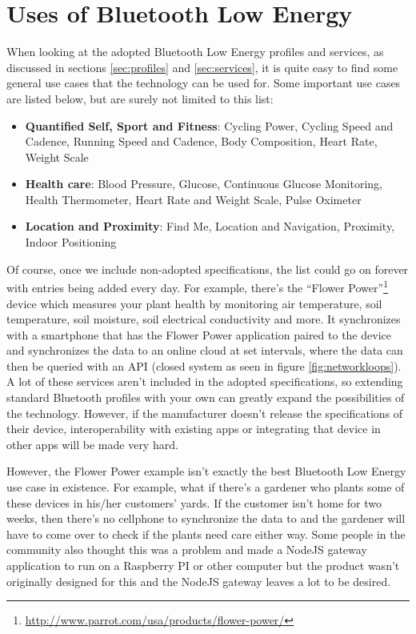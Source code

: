 \documentclass[pdftex,a4paper,12pt,twoside]{report}
\begin{document}
\newpage{}

\section{Uses of Bluetooth Low Energy}
\label{sec:usesble}
When looking at the adopted Bluetooth Low Energy profiles and services, as discussed in sections \ref{sec:profiles} and \ref{sec:services}, it is quite easy to find some general use cases that the technology can be used for. Some important use cases are listed below, but are surely not limited to this list:

\begin{itemize}
	\item{\textbf{Quantified Self, Sport and Fitness}: Cycling Power, Cycling Speed and Cadence, Running Speed and Cadence, Body Composition, Heart Rate, Weight Scale}
	\item{\textbf{Health care}: Blood Pressure, Glucose, Continuous Glucose Monitoring, Health Thermometer, Heart Rate and Weight Scale, Pulse Oximeter}
	\item{\textbf{Location and Proximity}: Find Me, Location and Navigation, Proximity, Indoor Positioning}
\end{itemize}

Of course, once we include non-adopted specifications, the list could go on forever with entries being added every day. For example, there's the ``Flower Power''\footnote{\url{http://www.parrot.com/usa/products/flower-power/}} device which measures your plant health by monitoring air temperature, soil temperature, soil moisture, soil electrical conductivity and more. It synchronizes with a smartphone that has the Flower Power application paired to the device and synchronizes the data to an online cloud at set intervals, where the data can then be queried with an API  (closed system as seen in figure \ref{fig:networkloops}). A lot of these services aren't included in the adopted specifications, so extending standard Bluetooth profiles with your own can greatly expand the possibilities of the technology. However, if the manufacturer doesn't release the specifications of their device, interoperability with existing apps or integrating that device in other apps will be made very hard.

However, the Flower Power example isn't exactly the best Bluetooth Low Energy use case in existence. For example, what if there's a gardener who plants some of these devices in his/her customers' yards. If the customer isn't home for two weeks, then there's no cellphone to synchronize the data to and the gardener will have to come over to check if the plants need care either way. Some people in the community also thought this was a problem and made a NodeJS gateway application to run on a Raspberry PI or other computer but the product wasn't originally designed for this and the NodeJS gateway leaves a lot to be desired.
\end{document}

